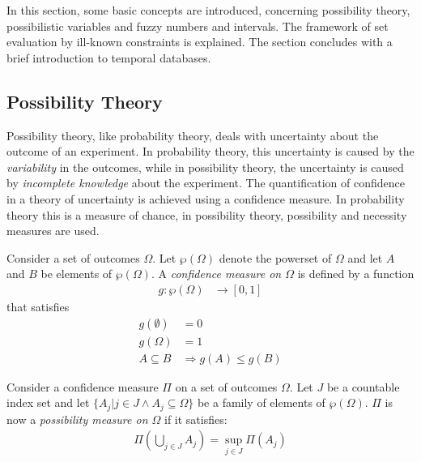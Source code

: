In this section, some basic concepts are introduced, concerning possibility theory, possibilistic variables and fuzzy numbers and intervals. The framework of set evaluation by ill-known constraints\cite{Pon11} is explained. The section concludes with a brief introduction to temporal databases.

\subsection{\label{subsec:possibility-theory}Possibility Theory}
Possibility theory, like probability theory, deals with uncertainty about the outcome of an experiment. In probability theory, this uncertainty is caused by the \emph{variability} in the outcomes, while in possibility theory, the uncertainty is caused by \emph{incomplete knowledge} about the experiment. The quantification of confidence in a theory of uncertainty is achieved using a confidence measure\cite{Shafer:1976:AMathematical}. In probability theory this is a measure of chance, in possibility theory, possibility and necessity measures are used.

\begin{definition}
Consider a set of outcomes $\Omega$. Let $\wp(\Omega)$ denote the powerset of $\Omega$ and let $A$ and $B$ be elements of $\wp(\Omega)$. A \emph{confidence measure on $\Omega$} is defined by a function
	\begin{align}
	g : \wp(\Omega) & \rightarrow \left[0,1\right]
	\end{align}
that satisfies
	\begin{align}
	g(\emptyset) &= 0 \\
	g(\Omega) &= 1 	\label{NormalizationProperty} \\
	A \subseteq B &\Rightarrow g(A) \leq g(B) \label{MonotonicityProperty}
	\end{align}
\end{definition}


\begin{definition}
Consider a confidence measure $\Pi$ on a set of outcomes $\Omega$. Let $J$ be a countable index set and let $\{ A_{j} | j \in J \wedge A_{j} \subseteq \Omega \}$ be a family of elements of $\wp(\Omega)$. $\Pi$ is now a \emph{possibility measure on $\Omega$} if it satisfies:
	\begin{align}
	\Pi\left(\bigcup_{j \in J} A_{j} \right) = \sup_{j \in J} \Pi(A_{j})
	\end{align}
\end{definition}

